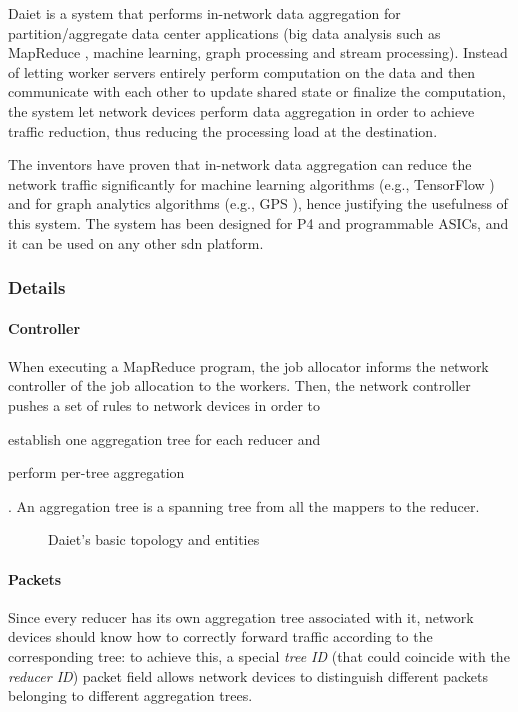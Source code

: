 Daiet \cite{daiet} is a system that performs in-network data aggregation for partition/aggregate data center applications (big data analysis such as MapReduce \cite{mapreduce}, machine learning, graph processing and stream processing).
Instead of letting worker servers entirely perform computation on the data and then communicate with each other to update shared state or finalize the computation, the system let network devices perform data aggregation in order to achieve traffic reduction, thus reducing the processing load at the destination.\par
The inventors have proven that in-network data aggregation can reduce the network traffic significantly for machine learning algorithms (e.g., TensorFlow \cite{tensorflow}) and for graph analytics algorithms (e.g., GPS \cite{gps}), hence justifying the usefulness of this system. The system has been designed for P4 \cite{p4} and programmable ASICs, and it can be used on any other \gls{sdn} platform.

\subsubsection{Details}
\paragraph{Controller}
When executing a MapReduce program, the job allocator informs the network controller of the job allocation to the workers.
Then, the network controller pushes a set of rules to network devices in order to
\begin{mylist}
    \item establish one aggregation tree for each reducer and
    \item perform per-tree aggregation
\end{mylist}.
An aggregation tree is a spanning tree from all the mappers to the reducer.

\begin{figure}[!htb]
    \centering
    \usebox{\daietbasic}
    \caption{Daiet's \texorpdfstring{\cite{daiet}}{} basic topology and entities}
\end{figure}

\paragraph{Packets}
Since every reducer has its own aggregation tree associated with it, network devices should know how to correctly forward traffic according to the corresponding tree: to achieve this, a special \textit{tree ID} (that could coincide with the \textit{reducer ID}) packet field allows network devices to distinguish different packets belonging to different aggregation trees.

